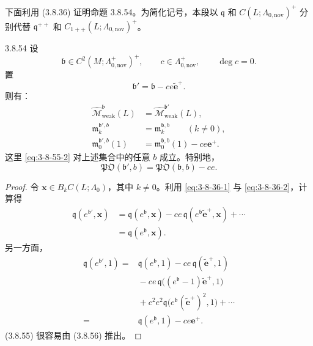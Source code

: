 下面利用 (3.8.36) 证明命题 3.8.54。为简化记号，本段以
$\mathfrak q$ 和 $C(L;\Lambda_{0,\mathrm{nov}})^+$ 分别代替
$\mathfrak q^{++}$ 和
$C_{1++}(L;\Lambda_{0,\mathrm{nov}})^+$。

\begin{proposition}{3.8.54}\label{prop:3-8-54}
设
\[
 \mathfrak b\in C^2(M;\Lambda^+_{0,\mathrm{nov}})^+,
 \qquad
 c\in\Lambda^+_{0,\mathrm{nov}},
 \qquad
 \deg c=0.
\]
置
\[
 \mathfrak b'
 =\mathfrak b-ce\widetilde{\mathbf e}^+.
\]
则有：
\begin{align}
 \widehat{\mathcal M}^{\mathfrak b}_{\mathrm{weak}}(L)
 &=
 \widehat{\mathcal M}^{\mathfrak b'}_{\mathrm{weak}}(L),
\tag{3.8.55.1}\label{eq:3-8-55-1}\\
 \mathfrak m_k^{\mathfrak b',b}
 &=
 \mathfrak m_k^{\mathfrak b,b}
 \qquad(k\ne0),
\tag{3.8.55.2}\label{eq:3-8-55-2}\\
 \mathfrak m_0^{\mathfrak b',b}(1)
 &=
 \mathfrak m_0^{\mathfrak b,b}(1)-ce\mathbf e^+.
\tag{3.8.55.3}\label{eq:3-8-55-3}
\end{align}
这里 \eqref{eq:3-8-55-2} 对上述集合中的任意 $b$ 成立。特别地，
\[
 \mathfrak{PO}(\mathfrak b',b)
 =
 \mathfrak{PO}(\mathfrak b,b)-ce.
\]
\end{proposition}

\begin{proof}
令 $\mathbf x\in B_kC(L;\Lambda_0)$，其中 $k\ne0$。利用
\eqref{eq:3-8-36-1} 与 \eqref{eq:3-8-36-2}，计算得
\begin{equation}
\begin{aligned}
 \mathfrak q(e^{\mathfrak b'},\mathbf x)
 &=
 \mathfrak q(e^{\mathfrak b},\mathbf x)
 -ce\,\mathfrak q
   (e^{\mathfrak b}\widetilde{\mathbf e}^+,\mathbf x)
 +\cdots\\
 &=
 \mathfrak q(e^{\mathfrak b},\mathbf x).
\end{aligned}
\tag{3.8.56.1}\label{eq:3-8-56-1}
\end{equation}
另一方面，
\begin{equation}
\begin{aligned}
\mathfrak q(e^{\mathfrak b'},1)
={}&
\mathfrak q(e^{\mathfrak b},1)
-ce\,\mathfrak q(\widetilde{\mathbf e}^+,1)\\
&{}-ce\,\mathfrak q
\bigl((e^{\mathfrak b}-1)\widetilde{\mathbf e}^+,1\bigr)\\
&{}+c^2e^2\mathfrak q
\bigl(e^{\mathfrak b}(\widetilde{\mathbf e}^+)^2,1\bigr)
+\cdots\\
={}&
\mathfrak q(e^{\mathfrak b},1)-ce\mathbf e^+.
\end{aligned}
\tag{3.8.56.2}\label{eq:3-8-56-2}
\end{equation}
(3.8.55) 很容易由 (3.8.56) 推出。
\end{proof}

